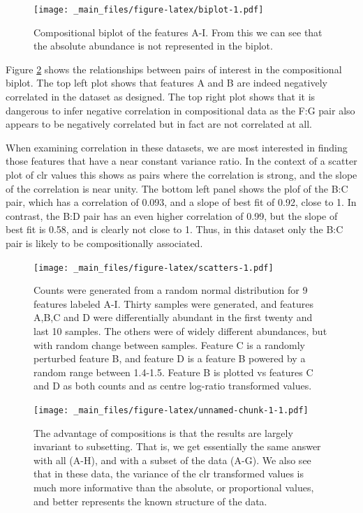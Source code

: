 \documentclass[onecolumn]{book}
\theoremstyle{definition}
\theoremstyle{definition}
\theoremstyle{definition}
\theoremstyle{remark}
\begin{document}
\begin{figure}
\centering
\texttt{[image: \_main\_files/figure-latex/biplot-1.pdf]}
\caption{\label{fig:biplot}Compositional biplot of the features A-I. From
this we can see that the absolute abundance is not represented in the
biplot.}
\end{figure}

Figure \ref{fig:scatters} shows the relationships between pairs of
interest in the compositional biplot. The top left plot shows that
features A and B are indeed negatively correlated in the dataset as
designed. The top right plot shows that it is dangerous to infer
negative correlation in compositional data as the F:G pair also appears
to be negatively correlated but in fact are not correlated at all.

When examining correlation in these datasets, we are most interested in
finding those features that have a near constant variance ratio. In the
context of a scatter plot of clr values this shows as pairs where the
correlation is strong, and the slope of the correlation is near unity.
The bottom left panel shows the plof of the B:C pair, which has a
correlation of 0.093, and a slope of best fit of 0.92, close to 1. In
contrast, the B:D pair has an even higher correlation of 0.99, but the
slope of best fit is 0.58, and is clearly not close to 1. Thus, in this
dataset only the B:C pair is likely to be compositionally associated.

\begin{figure}
\centering
\texttt{[image: \_main\_files/figure-latex/scatters-1.pdf]}
\caption{\label{fig:scatters}Counts were generated from a random normal
distribution for 9 features labeled A-I. Thirty samples were generated,
and features A,B,C and D were differentially abundant in the first
twenty and last 10 samples. The others were of widely different
abundances, but with random change between samples. Feature C is a
randomly perturbed feature B, and feature D is a feature B powered by a
random range between 1.4-1.5. Feature B is plotted vs features C and D
as both counts and as centre log-ratio transformed values.}
\end{figure}

\begin{figure}
\centering
\texttt{[image: \_main\_files/figure-latex/unnamed-chunk-1-1.pdf]}
\caption{\label{fig:unnamed-chunk-1}The advantage of compositions is that
the results are largely invariant to subsetting. That is, we get
essentially the same answer with all (A-H), and with a subset of the
data (A-G). We also see that in these data, the variance of the clr
transformed values is much more informative than the absolute, or
proportional values, and better represents the known structure of the
data.}
\end{figure}
\end{document}
